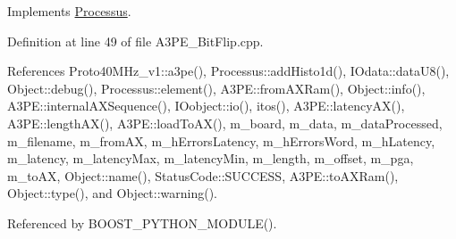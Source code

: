 Implements \hyperlink{classProcessus_aee88ad7b77ae7319cf8b128e9dd2ea11}{Processus}.

Definition at line 49 of file A3PE\_\-BitFlip.cpp.

References Proto40MHz\_\-v1::a3pe(), Processus::addHisto1d(), IOdata::dataU8(), Object::debug(), Processus::element(), A3PE::fromAXRam(), Object::info(), A3PE::internalAXSequence(), IOobject::io(), itos(), A3PE::latencyAX(), A3PE::lengthAX(), A3PE::loadToAX(), m\_\-board, m\_\-data, m\_\-dataProcessed, m\_\-filename, m\_\-fromAX, m\_\-hErrorsLatency, m\_\-hErrorsWord, m\_\-hLatency, m\_\-latency, m\_\-latencyMax, m\_\-latencyMin, m\_\-length, m\_\-offset, m\_\-pga, m\_\-toAX, Object::name(), StatusCode::SUCCESS, A3PE::toAXRam(), Object::type(), and Object::warning().

Referenced by BOOST\_\-PYTHON\_\-MODULE().


